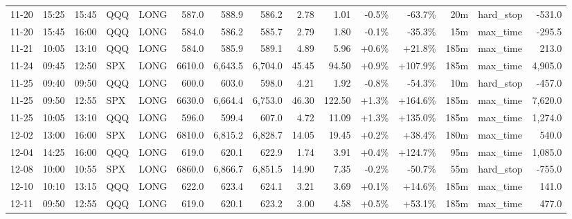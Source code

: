 \documentclass[11pt,a4paper,twoside]{article}
\begin{document}
\begin{landscape}
\begin{center}
\begin{longtable}{>{\color{txtmain}}l l l l l r r r r r r r r >{\color{txtmain}}l r}
11-20 & 15:25 & 15:45 & QQQ & LONG & 587.0 & 588.9 & 586.2 & 2.78 & 1.01 & \textcolor{lossred}{-0.5\%} & \textcolor{lossred}{-63.7\%} & 20m & hard\_stop & \textcolor{lossred}{-531.0} \\
11-20 & 15:45 & 16:00 & QQQ & LONG & 584.0 & 586.2 & 585.7 & 2.79 & 1.80 & \textcolor{lossred}{-0.1\%} & \textcolor{lossred}{-35.3\%} & 15m & max\_time & \textcolor{lossred}{-295.5} \\
11-21 & 10:05 & 13:10 & QQQ & LONG & 584.0 & 585.9 & 589.1 & 4.89 & 5.96 & \textcolor{wingreen}{+0.6\%} & \textcolor{wingreen}{+21.8\%} & 185m & max\_time & \textcolor{wingreen}{213.0} \\
11-24 & 09:45 & 12:50 & SPX & LONG & 6610.0 & 6,643.5 & 6,704.0 & 45.45 & 94.50 & \textcolor{wingreen}{+0.9\%} & \textcolor{wingreen}{+107.9\%} & 185m & max\_time & \textcolor{wingreen}{4,905.0} \\
11-25 & 09:40 & 09:50 & QQQ & LONG & 600.0 & 603.0 & 598.0 & 4.21 & 1.92 & \textcolor{lossred}{-0.8\%} & \textcolor{lossred}{-54.3\%} & 10m & hard\_stop & \textcolor{lossred}{-457.0} \\
11-25 & 09:50 & 12:55 & SPX & LONG & 6630.0 & 6,664.4 & 6,753.0 & 46.30 & 122.50 & \textcolor{wingreen}{+1.3\%} & \textcolor{wingreen}{+164.6\%} & 185m & max\_time & \textcolor{wingreen}{7,620.0} \\
11-25 & 10:05 & 13:10 & QQQ & LONG & 596.0 & 599.4 & 607.0 & 4.72 & 11.09 & \textcolor{wingreen}{+1.3\%} & \textcolor{wingreen}{+135.0\%} & 185m & max\_time & \textcolor{wingreen}{1,274.0} \\
12-02 & 13:00 & 16:00 & SPX & LONG & 6810.0 & 6,815.2 & 6,828.7 & 14.05 & 19.45 & \textcolor{wingreen}{+0.2\%} & \textcolor{wingreen}{+38.4\%} & 180m & max\_time & \textcolor{wingreen}{540.0} \\
12-04 & 14:25 & 16:00 & QQQ & LONG & 619.0 & 620.1 & 622.9 & 1.74 & 3.91 & \textcolor{wingreen}{+0.4\%} & \textcolor{wingreen}{+124.7\%} & 95m & max\_time & \textcolor{wingreen}{1,085.0} \\
12-08 & 10:00 & 10:55 & SPX & LONG & 6860.0 & 6,866.7 & 6,851.5 & 14.90 & 7.35 & \textcolor{lossred}{-0.2\%} & \textcolor{lossred}{-50.7\%} & 55m & hard\_stop & \textcolor{lossred}{-755.0} \\
12-10 & 10:10 & 13:15 & QQQ & LONG & 622.0 & 623.4 & 624.1 & 3.21 & 3.69 & \textcolor{wingreen}{+0.1\%} & \textcolor{wingreen}{+14.6\%} & 185m & max\_time & \textcolor{wingreen}{141.0} \\
12-11 & 09:50 & 12:55 & QQQ & LONG & 619.0 & 620.1 & 623.2 & 3.00 & 4.58 & \textcolor{wingreen}{+0.5\%} & \textcolor{wingreen}{+53.1\%} & 185m & max\_time & \textcolor{wingreen}{477.0} \\

\end{longtable}
\end{center}
\end{landscape}
\end{document}
